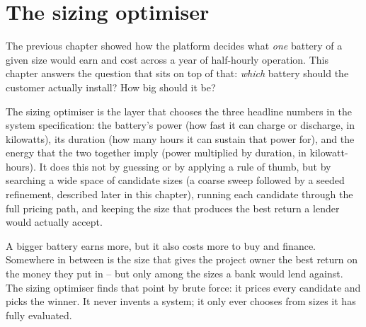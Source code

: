 \chapter{The sizing optimiser}
\label{ch:sizing}

The previous chapter showed how the platform decides what \emph{one} battery of a given size would earn and cost across a year of half-hourly operation. This chapter answers the question that sits on top of that: \emph{which} battery should the customer actually install? How big should it be?

The sizing optimiser is the layer that chooses the three headline numbers in the system specification: the battery's power (how fast it can charge or discharge, in kilowatts), its duration (how many hours it can sustain that power for), and the energy that the two together imply (power multiplied by duration, in kilowatt-hours). It does this not by guessing or by applying a rule of thumb, but by searching a wide space of candidate sizes (a coarse sweep followed by a seeded refinement, described later in this chapter), running each candidate through the full pricing path, and keeping the size that produces the best return a lender would actually accept.

\begin{plainnote}
A bigger battery earns more, but it also costs more to buy and finance. Somewhere in between is the size that gives the project owner the best return on the money they put in -- but only among the sizes a bank would lend against. The sizing optimiser finds that point by brute force: it prices every candidate and picks the winner. It never invents a system; it only ever chooses from sizes it has fully evaluated.
\end{plainnote}


